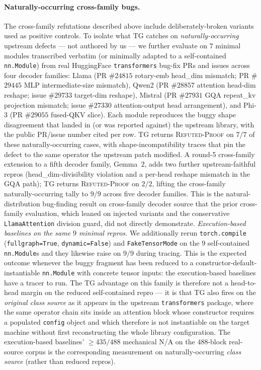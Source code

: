 \paragraph{Naturally-occurring cross-family bugs.}
The cross-family refutations described above include
deliberately-broken variants used as positive controls. To
isolate what \textsc{TG} catches on \emph{naturally-occurring}
upstream defects --- not authored by us --- we further evaluate
on $7$ minimal modules transcribed verbatim (or minimally
adapted to a self-contained \texttt{nn.Module}) from real
HuggingFace \texttt{transformers} bug-fix PRs and issues across
four decoder families: Llama (PR \#$24815$ rotary-emb head\_dim
mismatch; PR \#$29445$ MLP intermediate-size mismatch), Qwen2
(PR \#$28857$ attention head-dim reshape; issue \#$29733$
target-dim reshape), Mistral (PR \#$27931$ GQA repeat\_kv
projection mismatch; issue \#$27330$ attention-output head
arrangement), and Phi-3 (PR \#$29055$ fused-QKV slice).
Each module reproduces the buggy shape disagreement that
landed in (or was reported against) the upstream library, with
the public PR/issue number cited per row.
\textsc{TG} returns \textsc{Refuted-Proof} on $7/7$ of these
naturally-occurring cases, with shape-incompatibility traces
that pin the defect to the same operator the upstream patch
modified.
A round-5 cross-family extension to a fifth decoder family,
Gemma~$2$, adds two further upstream-faithful repros
(head\_dim-divisibility violation and a per-head reshape
mismatch in the GQA path); \textsc{TG} returns
\textsc{Refuted-Proof} on $2/2$, lifting the cross-family
naturally-occurring tally to $9/9$ across five decoder
families. This is the natural-distribution bug-finding result
on cross-family decoder source that the prior cross-family
evaluation, which leaned on injected variants and the conservative
\texttt{LlamaAttention} division guard, did not directly demonstrate.
\emph{Execution-based baselines on the same $9$ minimal repros.}
We additionally rerun \texttt{torch.compile} (\texttt{fullgraph=True},
\texttt{dynamic=False}) and \texttt{FakeTensorMode} on the
$9$ self-contained \texttt{nn.Module}s and they likewise raise on
$9/9$ during tracing.  This is the expected outcome whenever the
buggy fragment has been reduced to a constructor-default-instantiable
\texttt{nn.Module} with concrete tensor inputs: the execution-based
baselines have a tracer to run.  The \textsc{TG} advantage on this
family is therefore not a head-to-head margin on the reduced
self-contained repro --- it is that \textsc{TG} also fires on the
\emph{original class source} as it appears in the upstream
\texttt{transformers} package, where the same operator chain
sits inside an attention block whose constructor requires a
populated \texttt{config} object and which therefore is not
instantiable on the target machine without first reconstructing
the whole library configuration. The execution-based baselines'
$\ge 435/488$ mechanical \textsc{N/A} on the $488$-block real-source
corpus is the corresponding measurement on naturally-occurring
\emph{class source} (rather than reduced repros).


